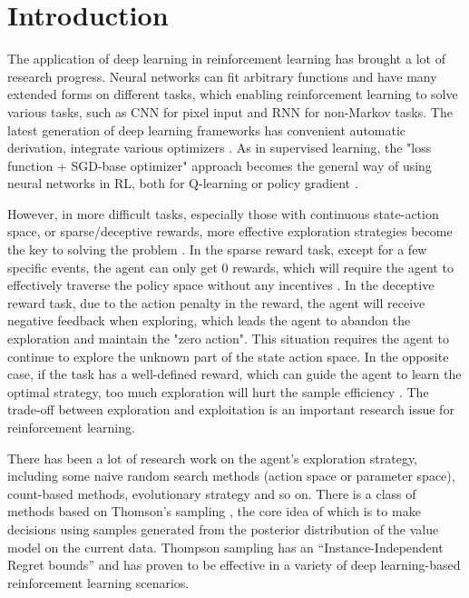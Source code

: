 \section{Introduction}
The application of deep learning in reinforcement learning has brought a lot of research progress\cite{DQN,AlphaGO,OpenAIdota}. Neural networks can fit arbitrary functions and have many extended forms on different tasks, which enabling reinforcement learning to solve various tasks, such as CNN for pixel input and RNN for non-Markov tasks\cite{DQN,RN395}. The latest generation of deep learning frameworks has convenient automatic derivation, integrate various optimizers \cite{PyTorch,MXNet,TF}. As in supervised learning, the "loss function + SGD-base optimizer" approach becomes the general way of using neural networks in RL, both for Q-learning or policy gradient \cite{DDPG,DQN,PPO}.

However, in more difficult tasks, especially those with continuous state-action space, or sparse/deceptive rewards, more effective exploration strategies become the key to solving the problem \cite{pnoise,colas2018gep}. In the sparse reward task, except for a few specific events, the agent can only get 0 rewards, which will require the agent to effectively traverse the policy space without any incentives \cite{VIME}. In the deceptive reward task, due to the action penalty in the reward, the agent will receive negative feedback when exploring, which leads the agent to abandon the exploration and maintain the "zero action"\cite{lehman2011abandoning,conti2018improving}. This situation requires the agent to continue to explore the unknown part of the state action space. In the opposite case, if the task has a well-defined reward, which can guide the agent to learn the optimal strategy, too much exploration will hurt the sample efficiency \cite{Showdown}. The trade-off between exploration and exploitation is an important research issue for reinforcement learning.

There has been a lot of research work on the agent's exploration strategy, including some naive random search methods (action space or parameter space)\cite{pnoise,DDPG}, count-based methods\cite{count1,count2}, evolutionary strategy \cite{EPGRL,ERL2} and so on. There is a class of methods based on Thomson's sampling \cite{TS}, the core idea of which is to make decisions using samples generated from the posterior distribution of the value model on the current data. Thompson sampling has an “Instance-Independent Regret bounds” \cite{TStutorial} and has proven to be effective in a variety of deep learning-based reinforcement learning scenarios\cite{BDQN,VIME,dropoutInference,lastLayerBayes}.

